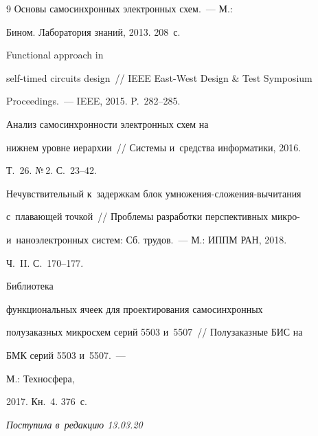 {{\begin{thebibliography}{9}
 Основы самосинхронных электронных схем.~--- М.: 


Бином. Лаборатория знаний, 2013. 208~с.




 Functional approach in


 self-timed circuits design~/\!\!/ IEEE East-West Design \& Test Symposium 


Proceedings.~--- IEEE, 2015. P.~282--285.




 Анализ самосинхронности электронных схем на 


нижнем уровне иерархии~/\!\!/ Системы и~средства информатики, 2016. 


Т.~26. №\,2. С.~23--42.






Нечувствительный к~задержкам блок умножения-сложения-вычитания 


с~плавающей точкой~/\!\!/ Проблемы разработки перспективных микро- 


и~наноэлектронных систем: Сб. трудов.~--- М.: ИППМ РАН, 2018. 


Ч.~II. С.~170--177.




 Библиотека 


функциональных ячеек для проектирования самосинхронных 


полузаказных микросхем серий 5503 и~5507~/\!\!/ Полузаказные БИС на 


БМК серий 5503 и~5507.~--- %


М.: Техносфера, 


2017. Кн.~4. 376~с.





 \end{thebibliography}


} }





\vspace*{-6pt}





\hfill{\small\textit{Поступила в~редакцию 13.03.20}}





